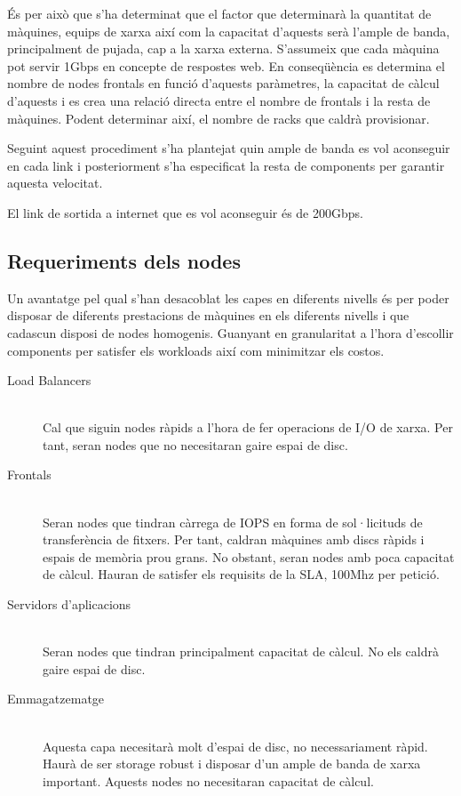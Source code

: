 \documentclass[a4paper, 11pt]{article}
\begin{document}
És per això que s'ha determinat que el factor que determinarà la quantitat de màquines, equips de xarxa així com la capacitat d'aquests serà l'ample de banda, principalment de pujada, cap a la xarxa externa. S'assumeix que cada màquina pot servir 1Gbps en concepte de respostes web. En conseqüència es determina el nombre de nodes frontals en funció d'aquests paràmetres, la capacitat de càlcul d'aquests i es crea una relació directa entre el nombre de frontals i la resta de màquines. Podent determinar així, el nombre de racks que caldrà provisionar. 

Seguint aquest procediment s'ha plantejat quin ample de banda es vol aconseguir en cada link i posteriorment s'ha especificat la resta de components per garantir aquesta velocitat. 

El link de sortida a internet que es vol aconseguir és de 200Gbps.

\subsection{Requeriments dels nodes}

Un avantatge pel qual s'han desacoblat les capes en diferents nivells és per poder disposar de diferents prestacions de màquines en els diferents nivells i que cadascun disposi de nodes homogenis. Guanyant en granularitat a l'hora d'escollir components per satisfer els workloads així com minimitzar els costos.

\begin{description}

\item[Load Balancers] \hfill \\
Cal que siguin nodes ràpids a l'hora de fer operacions de I/O de xarxa. Per tant, seran nodes que no necesitaran gaire espai de disc.

\item[Frontals] \hfill \\
Seran nodes que tindran càrrega de IOPS en forma de sol·licituds de transferència de fitxers. Per tant, caldran màquines amb discs ràpids i espais de memòria prou grans. No obstant, seran nodes amb poca capacitat de càlcul. Hauran de satisfer els requisits de la SLA, 100Mhz per petició.

\item[Servidors d'aplicacions] \hfill \\
Seran nodes que tindran principalment capacitat de càlcul. No els caldrà gaire espai de disc.

\item[Emmagatzematge] \hfill \\
Aquesta capa necesitarà molt d'espai de disc, no necessariament ràpid. Haurà de ser storage robust i disposar d'un ample de banda de xarxa important. Aquests nodes no necesitaran capacitat de càlcul.

\end{description}
\end{document}

